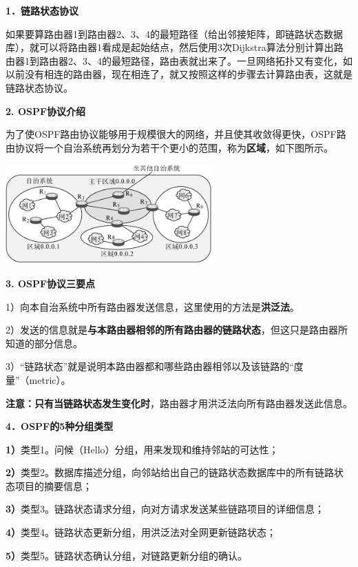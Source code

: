 \textbf{{1．链路状态协议}}

如果要算路由器1到路由器2、3、4的最短路径（给出邻接矩阵，即链路状态数据库），就可以将路由器1看成是起始结点，然后使用3次Dijkstra算法分别计算出路由器1到路由器2、3、4的最短路径，路由表就出来了。一旦网络拓扑又有变化，如以前没有相连的路由器，现在相连了，就又按照这样的步骤去计算路由表，这就是链路状态协议。

\textbf{{2. OSPF协议介绍}}

{为了使OSPF路由协议能够用于规模很大的网络，并且使其收敛得更快，OSPF路由协议将一个自治系统再划分为若干个更小的范围，称为\textbf{区域}，如下图所示。}

\includegraphics[width=3.12500in,height=1.51042in]{png-jpeg-pics/2E13E707A209CCB2E953519FE7AECD56.png}

\textbf{\textbf{{3. OSPF协议三要点}}}

1）向本自治系统中所有路由器发送信息，这里使用的方法是{\textbf{洪泛法}}。

2）发送的信息就是\textbf{与本路由器相邻的所有路由器的链路状态}，但这只是路由器所知道的部分信息。

3）``链路状态''就是说明本路由器都和哪些路由器相邻以及该链路的``度量''（metric）。

{\textbf{注意：}{\textbf{只有当链路状态发生变化时}，路由器才用洪泛法向所有路由器发送此信息。}}

\textbf{{4．OSPF的5种分组类型}}

\textbf{1）}类型1。问候（Hello）分组，用来发现和维持邻站的可达性；

\textbf{2）}类型2。数据库描述分组，向邻站给出自己的链路状态数据库中的所有链路状态项目的摘要信息；

\textbf{3）}类型3。链路状态请求分组，向对方请求发送某些链路项目的详细信息；

\textbf{4）}类型4。链路状态更新分组，用洪泛法对全网更新链路状态；

\textbf{5）}类型5。链路状态确认分组，对链路更新分组的确认。
